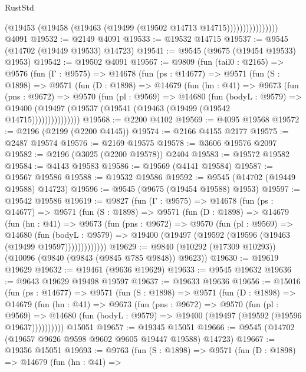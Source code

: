 \begin{lexlean}{RustStd}
\begin{coremodule}
                          (@19453 (@19458 (@19463 (@19499 (@19502 @14713 @14715))))))))))))))))
    @4091
@19532 := @2149 @4091
@19533 := @19532 @14715
@19537 := @9545 (@14702 (@19449 @19533) @14723)
@19541 := @9545 (@9675 (@19454 @19533) @1953)
@19542 := @19502 @4091
@19567 := @9809
    (fun (tail0 : @2165) =>
    @9576
      (fun (Γ : @9575) =>
      @14678
        (fun (ps : @14677) =>
        @9571
          (fun (S : @1898) =>
          @9571
            (fun (D : @1898) =>
            @14679
              (fun (hn : @41) =>
              @9673
                (fun (pns : @9672) =>
                @9570
                  (fun (pl : @9569) =>
                  @14680
                    (fun (bodyL : @9579) =>
                    @19400 (@19497 (@19537 (@19541 (@19463 (@19499 (@19542 @14715)))))))))))))))
@19568 := @2200 @4102
@19569 := @4095 @19568
@19572 := @2196 (@2199 (@2200 @4145))
@19574 := @2166 @4155 @2177
@19575 := @2487 @19574
@19576 := @2169 @19575
@19578 := @3606 @19576 @2097
@19582 := @2196 (@3025 (@2200 @19578)) @2404
@19583 := @19572 @19582
@19584 := @4143 @19583
@19586 := @19569 (@4141 @19584)
@19587 := @19567 @19586
@19588 := @19532 @19586
@19592 := @9545 (@14702 (@19449 @19588) @14723)
@19596 := @9545 (@9675 (@19454 @19588) @1953)
@19597 := @19542 @19586
@19619 := @9827
    (fun (Γ : @9575) =>
    @14678
      (fun (ps : @14677) =>
      @9571
        (fun (S : @1898) =>
        @9571
          (fun (D : @1898) =>
          @14679
            (fun (hn : @41) =>
            @9673
              (fun (pns : @9672) =>
              @9570
                (fun (pl : @9569) =>
                @14680
                  (fun (bodyL : @9579) =>
                  @19400 (@19497 (@19592 (@19596 (@19463 (@19499 @19597)))))))))))))
@19629 := @9840 (@10292 (@17309 @10293)) (@10096 (@9840 (@9843 (@9845 @785 @9848)) @9623))
@19630 := @19619 @19629
@19632 := @19461 (@9636 @19629)
@19633 := @9545 @19632
@19636 := @9643 @19629 @19498 @19597
@19637 := @19633 @19636
@19656 := @15016
    (fun (ps : @14677) =>
    @9571
      (fun (S : @1898) =>
      @9571
        (fun (D : @1898) =>
        @14679
          (fun (hn : @41) =>
          @9673
            (fun (pns : @9672) =>
            @9570
              (fun (pl : @9569) =>
              @14680 (fun (bodyL : @9579) => @19400 (@19497 (@19592 (@19596 @19637))))))))))
    @15051
@19657 := @19345 @15051
@19666 := @9545 (@14702 (@19657 @9626 @9598 @9602 @9605 @19447 @19588) @14723)
@19667 := @19356 @15051
@19693 := @9763
    (fun (S : @1898) =>
    @9571
      (fun (D : @1898) =>
      @14679
        (fun (hn : @41) =>

\end{coremodule}
\end{lexlean}
